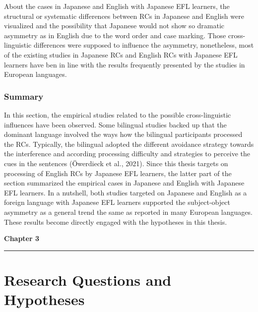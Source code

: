 \documentclass[
]{article}
\begin{document}
About the cases in Japanese and English with Japanese EFL learners, the
structural or systematic differences between RCs in Japanese and English
were visualized and the possibility that Japanese would not show so
dramatic asymmetry as in English due to the word order and case marking.
Those cross-linguistic differences were supposed to influence the
asymmetry, nonetheless, most of the existing studies in Japanese RCs and
English RCs with Japanese EFL learners have ben in line with the results
frequently presented by the studies in European languages.

\subsubsection{Summary}\label{summary-4}

In this section, the empirical studies related to the possible
cross-linguistic influences have been observed. Some bilingual studies
backed up that the dominant language involved the ways how the bilingual
participants processed the RCs. Typically, the bilingual adopted the
different avoidance strategy towards the interference and according
processing difficulty and strategies to perceive the cues in the
sentences (Öwerdieck et al., 2021). Since this thesis targets on
processing of English RCs by Japanese EFL learners, the latter part of
the section summarized the empirical cases in Japanese and English with
Japanese EFL learners. In a nutshell, both studies targeted on Japanese
and English as a foreign language with Japanese EFL learners supported
the subject-object asymmetry as a general trend the same as reported in
many European languages. These results become directly engaged with the
hypotheses in this thesis.

\newpage

\clearpage
\thispagestyle{empty}  %
\vspace*{-1cm}
\begin{flushleft}
\Huge \textbf{Chapter 3}
\end{flushleft}
\vspace{0.3cm}
\noindent\rule{\linewidth}{0.6pt}
\pagestyle{fancy}  %

\section{Research Questions and
Hypotheses}\label{research-questions-and-hypotheses}
\end{document}
